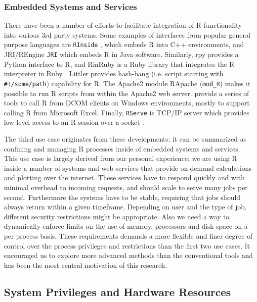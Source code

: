\documentclass[article]{jss}
\newcommand{\R}{\textsf{R}\xspace}
\newcommand{\Java}{\textsf{Java}\xspace}
\newcommand{\Cpp}{\textsf{C++}\xspace}
\begin{document}
\subsubsection{Embedded Systems and Services}

There have been a number of efforts to facilitate integration of \R
functionality into various 3rd party systems. Some examples of interfaces from
popular general purpose languages are \texttt{RInside} \citep{RInside}, which
embeds \R into \Cpp environments, and JRI/REngine \texttt{JRI} which
embeds \R in \Java software. Similarly, rpy \citep{moreira2006rpy} provides a
Python interface to R, and RinRuby is a Ruby library that integrates the
\R interpreter in Ruby \citep{dahl2008rinruby}. Littler provides
hash-bang (i.e. script starting with \texttt{\#!/some/path}) capability for
\R \citep{littler}. The Apache2 module RApache  (\texttt{mod\_R})
\citep{rapache} makes it possible to run \R scripts from within the
Apache2 web server. \cite{heiberger2009r} provide a series of tools to call
\R from DCOM clients on Windows environments, mostly to support
calling \R from Microsoft Excel. Finally, \texttt{RServe} is TCP/IP
server which provides low level access to an \R session over a socket
\citep{Rserve}.

The third use case originates from these developments: it can be summarized as
confining and managing \R processes inside of embedded systems and
services. This use case is largely derived from our personal experience: we are
using \R inside a number of systems and web services that provide
on-demand calculations and plotting over the internet. These services have to
respond quickly and with minimal overhead to incoming requests, and should
scale to serve many jobs per second. Furthermore the systems have to be stable,
requiring that jobs should always return within a given timeframe. Depending on
user and the type of job, different security restrictions might be appropriate.
Also we need a way to dynamically enforce limits on the use of memory,
processors and disk space on a per process basis. These requirements demands
a more flexible and finer degree of control over the process privileges and
restrictions than the first two use cases. It encouraged us to explore more
advanced methods than the conventional tools and has been the most central
motivation of this research.

\subsection{System Privileges and Hardware Resources}
\end{document}
